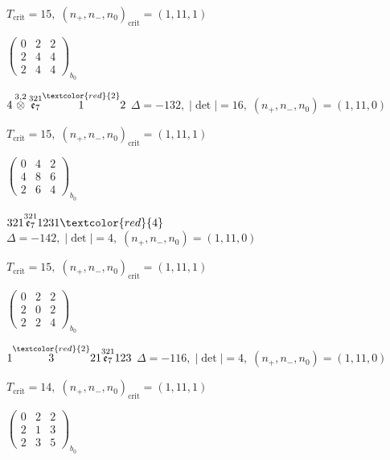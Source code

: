\documentclass[10pt]{article}
\begin{document}
\hspace{1em}$T_{\text{crit}}=15,\; (n_+,n_-,n_0)_{\text{crit}}=(1,11,1)$

\hspace{2em}$\left(\begin{smallmatrix}0 & 2 & 2 \\ 2 & 4 & 4 \\ 2 & 4 & 4\end{smallmatrix}\right)_{\!b_0}$

\smallskip

$4\overset{3,2}{\otimes}\overset{321}{\mathfrak{e}_7}\overset{\textcolor{red}{2}}{1}2$ \quad $\Delta=-132,\; |\det|=16,\; (n_+,n_-,n_0)=(1,11,0)$

\hspace{1em}$T_{\text{crit}}=15,\; (n_+,n_-,n_0)_{\text{crit}}=(1,11,1)$

\hspace{2em}$\left(\begin{smallmatrix}0 & 4 & 2 \\ 4 & 8 & 6 \\ 2 & 6 & 4\end{smallmatrix}\right)_{\!b_0}$

\smallskip

$321\overset{321}{\mathfrak{e}_7}1231\textcolor{red}{4}$ \quad $\Delta=-142,\; |\det|=4,\; (n_+,n_-,n_0)=(1,11,0)$

\hspace{1em}$T_{\text{crit}}=15,\; (n_+,n_-,n_0)_{\text{crit}}=(1,11,1)$

\hspace{2em}$\left(\begin{smallmatrix}0 & 2 & 2 \\ 2 & 0 & 2 \\ 2 & 2 & 4\end{smallmatrix}\right)_{\!b_0}$

$1\overset{\textcolor{red}{2}}{3}21\overset{321}{\mathfrak{e}_7}123$ \quad $\Delta=-116,\; |\det|=4,\; (n_+,n_-,n_0)=(1,11,0)$

\hspace{1em}$T_{\text{crit}}=14,\; (n_+,n_-,n_0)_{\text{crit}}=(1,11,1)$

\hspace{2em}$\left(\begin{smallmatrix}0 & 2 & 2 \\ 2 & 1 & 3 \\ 2 & 3 & 5\end{smallmatrix}\right)_{\!b_0}$
\end{document}
